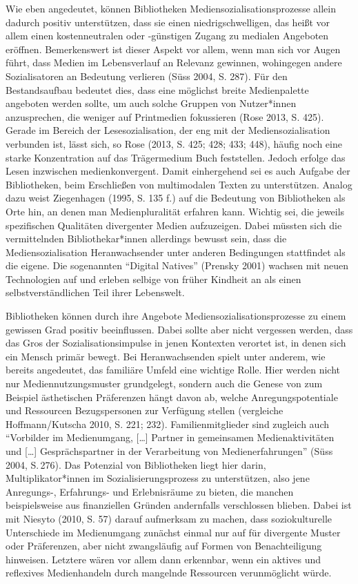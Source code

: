 \documentclass[a4paper,
fontsize=11pt,
oneside,
numbers=noperiodatend,
parskip=half-,
bibliography=totoc,
final
]{scrartcl}
\begin{document}
Wie eben angedeutet, können Bibliotheken Mediensozialisationsprozesse
allein dadurch positiv unterstützen, dass sie einen niedrigschwelligen,
das heißt vor allem einen kostenneutralen oder -günstigen Zugang zu
medialen Angeboten eröffnen. Bemerkenswert ist dieser Aspekt vor allem,
wenn man sich vor Augen führt, dass Medien im Lebensverlauf an Relevanz
gewinnen, wohingegen andere Sozialisatoren an Bedeutung verlieren (Süss
2004, S. 287). Für den Bestandsaufbau bedeutet dies, dass eine möglichst
breite Medienpalette angeboten werden sollte, um auch solche Gruppen von
Nutzer*innen anzusprechen, die weniger auf Printmedien fokussieren (Rose
2013, S. 425). Gerade im Bereich der Lesesozialisation, der eng mit der
Mediensozialisation verbunden ist, lässt sich, so Rose (2013, S. 425;
428; 433; 448), häufig noch eine starke Konzentration auf das
Trägermedium Buch feststellen. Jedoch erfolge das Lesen inzwischen
medienkonvergent. Damit einhergehend sei es auch Aufgabe der
Bibliotheken, beim Erschließen von multimodalen Texten zu unterstützen.
Analog dazu weist Ziegenhagen (1995, S. 135 f.) auf die Bedeutung von
Bibliotheken als Orte hin, an denen man Medienpluralität erfahren kann.
Wichtig sei, die jeweils spezifischen Qualitäten divergenter Medien
aufzuzeigen. Dabei müssten sich die vermittelnden Bibliothekar*innen
allerdings bewusst sein, dass die Mediensozialisation Heranwachsender
unter anderen Bedingungen stattfindet als die eigene. Die sogenannten
\enquote{Digital Natives} (Prensky 2001) wachsen mit neuen Technologien
auf und erleben selbige von früher Kindheit an als einen
selbstverständlichen Teil ihrer Lebenswelt.

Bibliotheken können durch ihre Angebote Mediensozialisationsprozesse zu
einem gewissen Grad positiv beeinflussen. Dabei sollte aber nicht
vergessen werden, dass das Gros der Sozialisationsimpulse in jenen
Kontexten verortet ist, in denen sich ein Mensch primär bewegt. Bei
Heranwachsenden spielt unter anderem, wie bereits angedeutet, das
familiäre Umfeld eine wichtige Rolle. Hier werden nicht nur
Mediennutzungsmuster grundgelegt, sondern auch die Genese von zum
Beispiel ästhetischen Präferenzen hängt davon ab, welche
Anregungspotentiale und Ressourcen Bezugspersonen zur Verfügung stellen
(vergleiche Hoffmann/Kutscha 2010, S. 221; 232). Familienmitglieder sind
zugleich auch \enquote{Vorbilder im Medienumgang, {[}\ldots{]} Partner
in gemeinsamen Medienaktivitäten und {[}\ldots{]} Gesprächspartner in
der Verarbeitung von Medienerfahrungen} (Süss 2004, S.\,276). Das
Potenzial von Bibliotheken liegt hier darin, Multiplikator*innen im
Sozialisierungsprozess zu unterstützen, also jene Anregungs-,
Erfahrungs- und Erlebnisräume zu bieten, die manchen beispielsweise aus
finanziellen Gründen andernfalls verschlossen blieben. Dabei ist mit
Niesyto (2010, S. 57) darauf aufmerksam zu machen, dass soziokulturelle
Unterschiede im Medienumgang zunächst einmal nur auf für divergente
Muster oder Präferenzen, aber nicht zwangsläufig auf Formen von
Benachteiligung hinweisen. Letztere wären vor allem dann erkennbar, wenn
ein aktives und reflexives Medienhandeln durch mangelnde Ressourcen
verunmöglicht würde.
\end{document}
